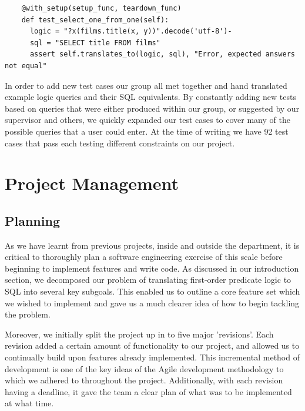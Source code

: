 \documentclass[a4paper, 11pt]{article}
\begin{document}
    \begin{verbatim}
    @with_setup(setup_func, teardown_func)
    def test_select_one_from_one(self):
      logic = "?x(films.title(x, y))".decode('utf-8')-
      sql = "SELECT title FROM films"
      assert self.translates_to(logic, sql), "Error, expected answers not equal"
    \end{verbatim}

    In order to add new test cases our group all met together and hand translated 
    example logic queries and their SQL equivalents. By constantly adding new tests 
    based on queries that were either produced within our group, or suggested by our 
    supervisor and others, we quickly expanded our test cases to cover many of the 
    possible queries that a user could enter. At the time of writing we have 92 test 
    cases that pass each testing different constraints on our project.


 

\section{Project Management}
  \subsection{Planning}
    As we have learnt from previous projects, inside and outside the
    department, it is critical to thoroughly plan a software engineering
    exercise of this scale before beginning to implement features and write
    code. As discussed in our introduction section, we decomposed our problem
    of translating first-order predicate logic to SQL into several key
    subgoals. This enabled us to outline a core feature set which we wished to
    implement and gave us a much clearer idea of how to begin tackling the
    problem.

    Moreover, we initially split the project up in to five major 'revisions'.
    Each revision added a certain amount of functionality to our project, and
    allowed us to continually build upon features already implemented. This
    incremental method of development is one of the key ideas of the Agile
    development methodology to which we adhered to throughout the project.
    \cite{agilemanifesto} Additionally, with each revision having a
    deadline, it gave the team a clear plan of what was to be implemented at
    what time.
\end{document}
